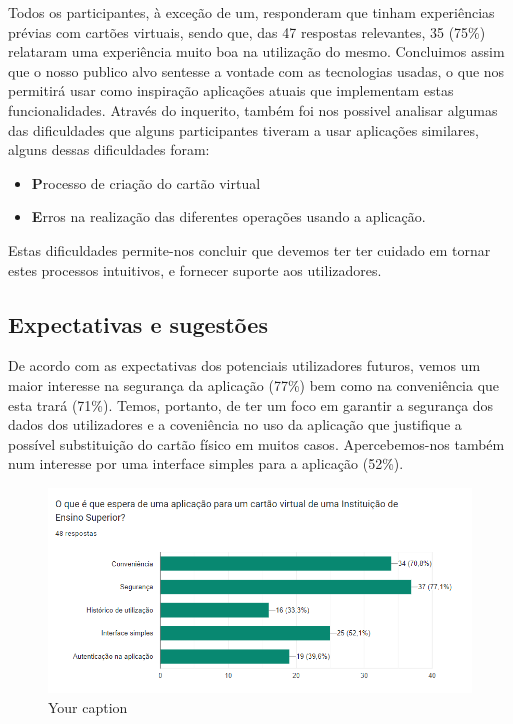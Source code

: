 \documentclass{article}
\begin{document}
Todos os participantes, à exceção de um, responderam que tinham experiências prévias com cartões virtuais, sendo que, das 47 respostas relevantes, 35 (75\%) relataram uma experiência muito boa na utilização do mesmo. Concluimos assim que o nosso publico alvo sentesse a vontade com as tecnologias usadas, o que nos permitirá usar como inspiração aplicações atuais que implementam estas funcionalidades.
Através do inquerito, também foi nos possivel analisar algumas das dificuldades que alguns participantes tiveram a usar aplicações similares, alguns dessas dificuldades foram:
\begin{itemize}
    \item \textbf Processo de criação do cartão virtual
    \item \textbf Erros na realização das diferentes operações usando a aplicação.
\end{itemize}


Estas dificuldades permite-nos concluir que devemos ter ter cuidado em tornar estes processos intuitivos, e fornecer suporte aos utilizadores.



\subsection{Expectativas e sugestões}

De acordo com as expectativas dos potenciais utilizadores futuros, vemos um maior interesse na segurança da aplicação (77\%) bem como na conveniência que esta trará (71\%). Temos, portanto, de ter um foco em garantir a segurança dos dados dos utilizadores e a coveniência no uso da aplicação que justifique a possível substituição do cartão físico em muitos casos.
Apercebemos-nos também num interesse por uma interface simples para a aplicação (52\%).

\begin{figure}[h]
    \centering
    \includegraphics[width=1\textwidth]{images/questionaire4.png}
    \caption{Your caption}
\end{figure}
\end{document}
